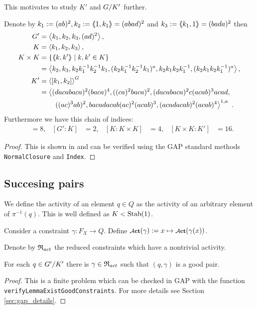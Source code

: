 \documentclass[a4paper,11pt]{amsart}
\begin{document}
This motivates to study $K'$ and ${G/K'}$ further.
\begin{lem} \label{lem:subgroupsOfG}
Denote by $k_1 := (ab)^2, k_2:=\langle\negthickspace\langle1,k_1\rangle\negthickspace\rangle = (abad)^2$ and $k_3:=\langle\negthickspace\langle k_1,1\rangle\negthickspace\rangle = (bada)^2$ then 
 \begin{align*}
  G' &= \left< k_1,k_2,k_3,(ad)^2\right>, \\
  K &= \left< k_1,k_2,k_3\right>, \\
  K\times K &= \{\langle\negthickspace\langle k,k'\rangle\negthickspace\rangle \mid k,k'\in K\} \\&= \left< k_2,k_3,k_2k_1^{-1}k_2^{-1}k_1,(k_2k_1^{-1}k_2^{-1}k_1)^a,k_2k_1k_2k_1^{-1},(k_2k_1k_2k_1^{-1})^a  \right>,\\
  K' &= \left< [k_1,k_2] \right>^G \\ 
  &= \left<(dacabaca)^2(baca)^4,((ca)^2baca)^2,(dacabaca)^2c(acab)^3acad,\right.\\
  &\qquad\left.((ac)^3ab)^2, bacadacab(ac)^2(acab)^3, (acadacab)^2(acab)^4\right>^{1,a}\ .
 \end{align*}
Furthermore we have this chain of indices:
\begin{align*}
  [G:G']&=8, & [G':K]&=2, &[K:K\times K]&= 4, &[K\times K:K']&=16. 
\end{align*}
\end{lem}
\begin{proof}
 This is shown in \cite{Bartholdi:BranchGroups} and can be verified using the GAP standard methods
 \lstinline{NormalClosure} and \lstinline{Index}. 
\end{proof}

\subsection{Succesing pairs}
\begin{defi}
 We define the activity of an element $q\in Q$ as the activity of an arbitrary element of $\pi^{-1}(q)$. 
 This is well defined as $K<\textup{Stab}(1)$. 
 
 Consider a constraint $\gamma\colon F_X \to Q$. 
 Define $\act(\gamma):= x \mapsto \act(\gamma(x))$.
 
 Denote by $\mathfrak{R}_{act}$ the reduced constraints which have a nontrivial activity.
\end{defi}

\begin{lem} \label{lem:existsGoodGamma}
 For each $q\in{G'/K'}$ there is $\gamma\in \mathfrak{R}_{act}$ such that $(q,\gamma)$ is a 
 good pair.
\end{lem}
\begin{proof}
 This is a finite problem which can be checked in GAP with the function \lstinline{verifyLemmaExistGoodConstraints}.
 For more details see Section \ref{sec:gap_details}.
\end{proof}
\end{document}
